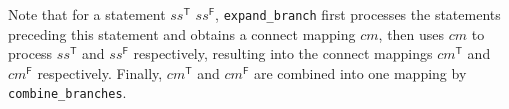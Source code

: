 Note that for a statement  $ss^\mathsf{T}$  $ss^\mathsf{F}$, {\tt expand\_branch} first processes the statements preceding this statement and obtains a connect mapping $cm$, then uses $cm$ to process $ss^\mathsf{T}$ and $ss^\mathsf{F}$ respectively, resulting into the connect mappings $cm^\mathsf{T}$ and $cm^\mathsf{F}$ respectively. Finally, $cm^\mathsf{T}$ and $cm^\mathsf{F}$ are combined into one mapping by {\tt combine\_branches}. 
 



